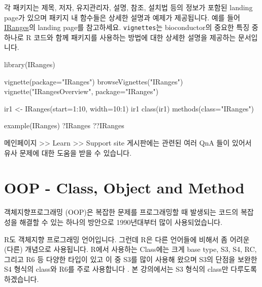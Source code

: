 \documentclass[
]{book}
\newenvironment{Shaded}{\begin{snugshade}}{\end{snugshade}}
\newcommand{\AttributeTok}[1]{\textcolor[rgb]{0.77,0.63,0.00}{#1}}
\newcommand{\DecValTok}[1]{\textcolor[rgb]{0.00,0.00,0.81}{#1}}
\newcommand{\FunctionTok}[1]{\textcolor[rgb]{0.00,0.00,0.00}{#1}}
\newcommand{\NormalTok}[1]{#1}
\newcommand{\OtherTok}[1]{\textcolor[rgb]{0.56,0.35,0.01}{#1}}
\newcommand{\SpecialCharTok}[1]{\textcolor[rgb]{0.00,0.00,0.00}{#1}}
\newcommand{\StringTok}[1]{\textcolor[rgb]{0.31,0.60,0.02}{#1}}
\begin{document}
각 패키지는 제목, 저자, 유지관리자, 설명, 참조, 설치법 등의 정보가 포함된 landing page가 있으며 패키지 내 함수들은 상세한 설명과 예제가 제공됩니다. 예를 들어 \href{http://bioconductor.org/packages/release/bioc/html/IRanges.html}{IRanges}의 landing page를 참고하세요. \texttt{vignettes}는 bioconductor의 중요한 특징 중 하나로 R 코드와 함께 패키지를 사용하는 방법에 대한 상세한 설명을 제공하는 문서입니다.

\begin{Shaded}
\begin{Highlighting}[]

\FunctionTok{library}\NormalTok{(IRanges)}

\FunctionTok{vignette}\NormalTok{(}\AttributeTok{package=}\StringTok{"IRanges"}\NormalTok{)}
\FunctionTok{browseVignettes}\NormalTok{(}\StringTok{"IRanges"}\NormalTok{)}
\FunctionTok{vignette}\NormalTok{(}\StringTok{"IRangesOverview"}\NormalTok{, }\AttributeTok{package=}\StringTok{"IRanges"}\NormalTok{)}

\NormalTok{ir1 }\OtherTok{\textless{}{-}} \FunctionTok{IRanges}\NormalTok{(}\AttributeTok{start=}\DecValTok{1}\SpecialCharTok{:}\DecValTok{10}\NormalTok{, }\AttributeTok{width=}\DecValTok{10}\SpecialCharTok{:}\DecValTok{1}\NormalTok{)}
\NormalTok{ir1}
\FunctionTok{class}\NormalTok{(ir1)}
\FunctionTok{methods}\NormalTok{(}\AttributeTok{class=}\StringTok{"IRanges"}\NormalTok{)}

\FunctionTok{example}\NormalTok{(IRanges)}
\NormalTok{?IRanges}
\NormalTok{??IRanges}
\end{Highlighting}
\end{Shaded}

메인페이지 \textgreater\textgreater{} Learn \textgreater\textgreater{} Support site 게시판에는 관련된 여러 QnA 들이 있어서 유사 문제에 대한 도움을 받을 수 있습니다.

\hypertarget{oop---class-object-and-method}{%
\section{OOP - Class, Object and Method}\label{oop---class-object-and-method}}

객체지향프로그래밍 (OOP)은 복잡한 문제를 프로그래밍할 때 발생되는 코드의 복잡성을 해결할 수 있는 하나의 방안으로 1990년대부터 많이 사용되었습니다.

R도 객체지향 프로그래밍 언어입니다. 그런데 R은 다른 언어들에 비해서 좀 어려운 (다른) 개념으로 사용됩니다. R에서 사용하는 Class에는 크게 base type, S3, S4, RC, 그리고 R6 등 다양한 타입이 있고 이 중 S3를 많이 사용해 왔으며 S3의 단점을 보완한 S4 형식의 class와 R6를 주로 사용합니다 \citep{AdvancedR}. 본 강의에서는 S3 형식의 class만 다루도록 하겠습니다.
\end{document}
